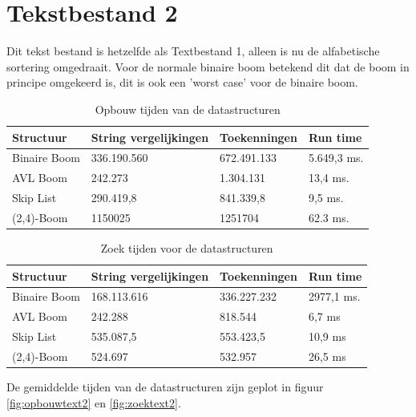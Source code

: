 \clearpage

\section{Tekstbestand 2}

Dit tekst bestand is hetzelfde als Textbestand 1, alleen is nu de alfabetische sortering omgedraait. Voor de normale binaire boom betekend dit dat de boom in principe omgekeerd is, dit is ook een 'worst case' voor de binaire boom.

\begin{table}
\begin{tabularx}{\linewidth}{| l | X| X| X | }
 \hline
 Structuur & String vergelijkingen &  Toekenningen & Run time \\
 \hline
 	Binaire Boom & 336.190.560 & 672.491.133 & 5.649,3 ms. \\
 	\hline
 	AVL Boom & 242.273 & 1.304.131 & 13,4 ms. \\
 	\hline
 	Skip List & 290.419,8 & 841.339,8 & 9,5 ms. \\
 	\hline
 	(2,4)-Boom & 1150025 & 1251704 & 62.3 ms. \\
 	\hline
\end{tabularx}
\label{tbl_text1_search}
\caption{Opbouw tijden van de datastructuren}
\end{table}


\begin{table}
\begin{tabularx}{\linewidth}{| l | X| X| X | }
 \hline
 Structuur & String vergelijkingen &  Toekenningen & Run time \\
 \hline
 	Binaire Boom &168.113.616 & 336.227.232 &  2977,1 ms. \\
 	\hline
 	AVL Boom &242.288
 & 818.544 & 6,7
 ms \\
 	\hline
 	Skip List &535.087,5
 & 553.423,5
 &  10,9 ms \\
 	\hline
 	(2,4)-Boom &524.697 & 532.957 &  26,5 ms \\
 	\hline
\end{tabularx}
\label{tbl_text1_search}
\caption{Zoek tijden voor de datastructuren}
\end{table}

De gemiddelde tijden van de datastructuren zijn geplot in figuur \ref{fig:opbouwtext2} en \ref{fig:zoektext2}.



